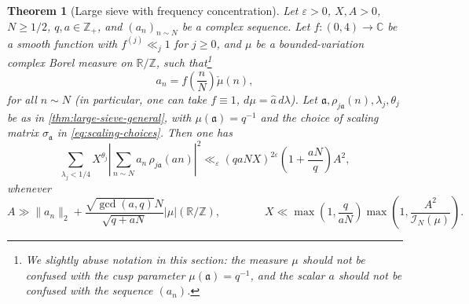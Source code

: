 \documentclass[reqno,11pt]{amsart}
\newtheorem{theorem}{Theorem}%
\theoremstyle{remark}
\numberwithin{equation}{section}
\newcommand{\Z}{\mathbb{Z}}
\newcommand{\R}{\mathbb{R}}
\newcommand{\C}{\mathbb{C}}
\newcommand{\mI}{\mathcal{I}}
\newcommand{\ma}{\mathfrak{a}}
\newcommand{\eps}{\varepsilon}
\renewcommand{\hat}{\widehat}
\begin{document}
\begin{theorem}[Large sieve with frequency concentration] \label{thm:large-sieve-freq-concentration}
Let $\eps > 0$, $X, A > 0$, $N \ge 1/2$, $q, a \in \Z_+$, and $(a_n)_{n \sim N}$ be a complex sequence. Let $f : (0, 4) \to \C$ be a smooth function with $f^{(j)} \ll_j 1$ for $j \ge 0$, and $\mu$ be a bounded-variation complex Borel measure on $\R/\Z$, such that\footnote{We slightly abuse notation in this section: the measure $\mu$ should not be confused with the cusp parameter $\mu(\ma) = q^{-1}$, and the scalar $a$ should not be confused with the sequence $(a_n)$.}
\[
    a_n = f\left(\frac{n}{N}\right) \check{\mu}\left(n\right),
\]
for all $n \sim N$ (in particular, one can take $f \equiv 1$, $d\mu = \hat{a}\, d\lambda$). Let $\ma, \rho_{j\ma}(n), \lambda_j,\theta_j$ be as in \cref{thm:large-sieve-general}, with $\mu(\ma) = q^{-1}$ and the choice of scaling matrix $\sigma_{\ma}$ in \cref{eq:scaling-choices}. Then one has
\begin{equation} \label{eq:large-sieve-freq-concentration}
    \sum_{\lambda_j < 1/4}
    X^{\theta_j} 
    \left\vert 
    \sum_{n \sim N} a_n\, \rho_{j\ma}(an)
    \right\vert^2 
    \ll_\eps 
    (qaNX)^{2\eps}
    \left(1 + \frac{aN}{q}\right) A^2,
\end{equation}
whenever
\begin{equation} \label{eq:X-freq-concentration}
    A \gg \|a_n\|_2 + \frac{\sqrt{\gcd(a, q)} N}{\sqrt{q+aN}} |\mu|(\R/\Z),
    \qquad\qquad
    X \ll \max\left(1, \frac{q}{aN}\right) \max\left(1, \frac{A^2}{\mI_N(\mu)}\right).
\end{equation}
\end{theorem}
\end{document}
